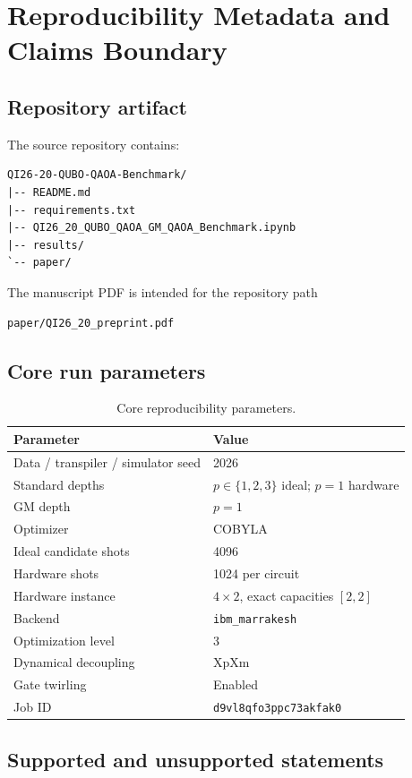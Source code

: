 \section{Reproducibility Metadata and Claims Boundary}
\label{app:reproducibility}

\subsection{Repository artifact}

The source repository contains:
\begin{verbatim}
QI26-20-QUBO-QAOA-Benchmark/
|-- README.md
|-- requirements.txt
|-- QI26_20_QUBO_QAOA_GM_QAOA_Benchmark.ipynb
|-- results/
`-- paper/
\end{verbatim}
The manuscript PDF is intended for the repository path
\begin{verbatim}
paper/QI26_20_preprint.pdf
\end{verbatim}

\subsection{Core run parameters}

\begin{table}[H]
\centering
\caption{Core reproducibility parameters.}
\begin{tabular}{ll}
\toprule
Parameter & Value\\
\midrule
Data / transpiler / simulator seed & 2026\\
Standard depths & $p\in\{1,2,3\}$ ideal; $p=1$ hardware\\
GM depth & $p=1$\\
Optimizer & COBYLA\\
Ideal candidate shots & 4096\\
Hardware shots & 1024 per circuit\\
Hardware instance & $4\times2$, exact capacities $[2,2]$\\
Backend & \texttt{ibm\_marrakesh}\\
Optimization level & 3\\
Dynamical decoupling & XpXm\\
Gate twirling & Enabled\\
Job ID & \texttt{d9vl8qfo3ppc73akfak0}\\
\bottomrule
\end{tabular}
\end{table}

\subsection{Supported and unsupported statements}

